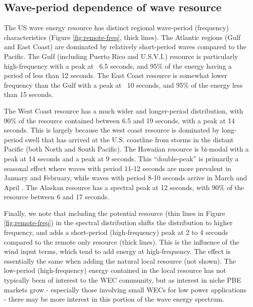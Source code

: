 \subsection{Wave-period dependence of wave resource}

The US wave energy resource has distinct regional wave-period (frequency) characteristics (Figure \ref{fig:remote-freq}, thick lines). The Atlantic regions (Gulf and East Coast) are dominated by relatively short-period waves compared to the Pacific. The Gulf (including Puerto Rico and U.S.V.I.) resource is particularly high-frequency with a peak at ~6.5 seconds, and 95\% of the energy having a period of less than 12 seconds. The East Coast resource is somewhat lower frequency than the Gulf with a peak at ~10 seconds, and 95\% of the energy less than 15 seconds.

The West Coast resource has a much wider and longer-period distribution, with 90\% of the resource contained between 6.5 and 19 seconds, with a peak at 14 seconds. This is largely because the west coast resource is dominated by long-period swell that has arrived at the U.S. coastline from storms in the distant Pacific (both North and South Pacific). The Hawaiian resource is bi-modal with a peak at 14 seconds and a peak at 9 seconds. This ``double-peak'' is primarily a seasonal effect where waves with period 11-12 seconds are more prevalent in January and February, while waves with period 8-10 seconds arrive in March and April \citep[][]{stopa2013wave}. The Alaskan resource has a spectral peak at 12 seconds, with 90\% of the resource between 6 and 17 seconds.

Finally, we note that including the potential resource (thin lines in Figure \ref{fig:remote-freq}) in the spectral distribution shifts the distribution to higher frequency, and adds a short-period (high-frequency) peak at 2 to 4 seconds compared to the remote only resource (thick lines). This is the influence of the wind input terms, which tend to add energy at high-frequency. The effect is essentially the same when adding the natural local resource (not shown). The low-period (high-frequency) energy contained in the local resource has not typically been of interest to the WEC community, but as interest in niche PBE markets grow - especially those involving small WECs for low power applications - there may be more interest in this portion of the wave energy spectrum.

